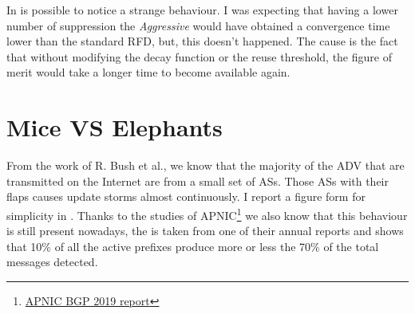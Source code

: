In  is possible to notice a strange behaviour.
I was expecting that having a lower number of suppression the \textit{Aggressive}
would have obtained a convergence time lower than the standard \ac{RFD}, but,
this doesn't happened.
The cause is the fact that without modifying the decay function or the reuse
threshold, the figure of merit would take a longer time to become available again.


\section{Mice VS Elephants}
\label{sec:rfd_mice_vs_elephants}


From the work of R. Bush et al., \cite{pelsser2011route} we know that the majority
of the \ac{ADV} that are transmitted on the Internet are from a small set of \acp{AS}.
Those \acp{AS} with their flaps causes update storms almost continuously.
I report a figure form \cite{pelsser2011route} for simplicity in
.
Thanks to the studies of
\ac{APNIC}\footnote{\href{https://blog.apnic.net/2020/01/15/bgp-in-2019-bgp-churn/}{APNIC BGP 2019 report}}
we also know that this behaviour is still present nowadays, the 
is taken from one of their annual reports and shows that \num{10}\% of
all the active prefixes produce more or less the \num{70}\% of the total
messages detected.

